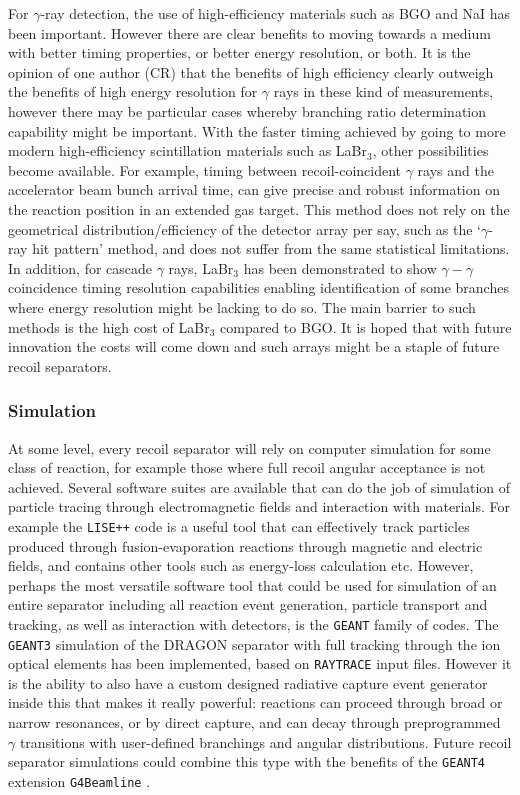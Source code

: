 For $\gamma$-ray detection, the use of high-efficiency materials such as BGO and NaI has been important. However there are clear benefits to moving towards a medium with better timing properties, or better energy resolution, or both. It is the opinion of one author (CR) that the benefits of high efficiency clearly outweigh the benefits of high energy resolution for $\gamma$ rays in these kind of measurements, however there may be particular cases whereby branching ratio determination capability might be important. With the faster timing achieved by going to more modern high-efficiency scintillation materials such as LaBr$_3$, other possibilities become available. For example, timing between recoil-coincident $\gamma$ rays and the accelerator beam bunch arrival time, can give precise and robust information on the reaction position in an extended gas target. This method does not rely on the geometrical distribution/efficiency of the detector array per say, such as the `$\gamma$-ray hit pattern' method, and does not suffer from the same statistical limitations. In addition, for cascade $\gamma$ rays, LaBr$_3$ has been demonstrated to show $\gamma-\gamma$ coincidence timing resolution capabilities enabling identification of some branches where energy resolution might be lacking to do so. The main barrier to such methods is the high cost of LaBr$_3$ compared to BGO. It is hoped that with future innovation the costs will come down and such arrays might be a staple of future recoil separators. 

\subsubsection{Simulation}

At some level, every recoil separator will rely on computer simulation for some class of reaction, for example those where full recoil angular acceptance is not achieved. Several software suites are available that can do the job of simulation of particle tracing through electromagnetic fields and interaction with materials. For example the \texttt{LISE++} code \cite{lise++} is a useful tool that can effectively track particles produced through fusion-evaporation reactions through magnetic and electric fields, and contains other tools such as energy-loss calculation etc. However, perhaps the most versatile software tool that could be used for simulation of an entire separator including all reaction event generation, particle transport and tracking, as well as interaction with detectors, is the \texttt{GEANT} family of codes. The \texttt{GEANT3} \cite{geant3} simulation of the DRAGON separator with full tracking through the ion optical elements has been implemented, based on \texttt{RAYTRACE} input files. However it is the ability to also have a custom designed radiative capture event generator inside this that makes it really powerful: reactions can proceed through broad or narrow resonances, or by direct capture, and can decay through preprogrammed $\gamma$ transitions with user-defined branchings and angular distributions. Future recoil separator simulations could combine this type with the benefits of the \texttt{GEANT4} extension \texttt{G4Beamline} \cite{geant4}. 

